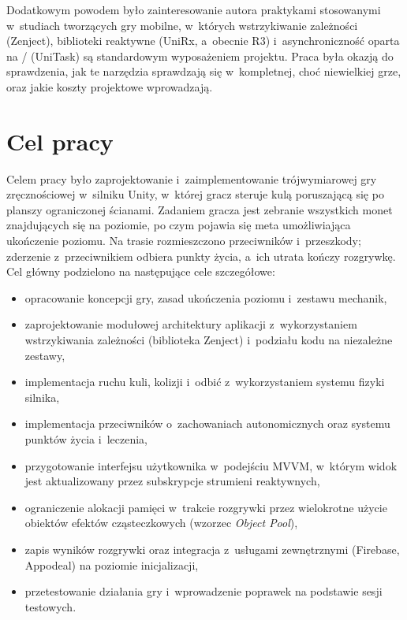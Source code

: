 Dodatkowym powodem było zainteresowanie autora praktykami stosowanymi w~studiach
tworzących gry mobilne, w~których wstrzykiwanie zależności (Zenject), biblioteki reaktywne
(UniRx, a~obecnie R3) i~asynchroniczność oparta na / (UniTask) są
standardowym wyposażeniem projektu. Praca była okazją do sprawdzenia, jak te narzędzia
sprawdzają się w~kompletnej, choć niewielkiej grze, oraz jakie koszty projektowe
wprowadzają.

\section{Cel pracy}

Celem pracy było zaprojektowanie i~zaimplementowanie trójwymiarowej gry zręcznościowej
w~silniku Unity, w~której gracz steruje kulą poruszającą się po planszy ograniczonej
ścianami. Zadaniem gracza jest zebranie wszystkich monet znajdujących się na poziomie,
po czym pojawia się meta umożliwiająca ukończenie poziomu. Na trasie rozmieszczono
przeciwników i~przeszkody; zderzenie z~przeciwnikiem odbiera punkty życia, a~ich utrata
kończy rozgrywkę. Cel główny podzielono na następujące cele szczegółowe:
\begin{itemize}[leftmargin=1.9cm, itemsep=1pt]
  \item opracowanie koncepcji gry, zasad ukończenia poziomu i~zestawu mechanik,
  \item zaprojektowanie modułowej architektury aplikacji z~wykorzystaniem
        wstrzykiwania zależności (biblioteka Zenject) i~podziału kodu na niezależne zestawy,
  \item implementacja ruchu kuli, kolizji i~odbić z~wykorzystaniem systemu fizyki silnika,
  \item implementacja przeciwników o~zachowaniach autonomicznych oraz systemu punktów
        życia i~leczenia,
  \item przygotowanie interfejsu użytkownika w~podejściu MVVM, w~którym widok jest
        aktualizowany przez subskrypcje strumieni reaktywnych,
  \item ograniczenie alokacji pamięci w~trakcie rozgrywki przez wielokrotne użycie obiektów
        efektów cząsteczkowych (wzorzec \emph{Object Pool}),
  \item zapis wyników rozgrywki oraz integracja z~usługami zewnętrznymi (Firebase,
        Appodeal) na poziomie inicjalizacji,
  \item przetestowanie działania gry i~wprowadzenie poprawek na podstawie sesji testowych.
\end{itemize}

